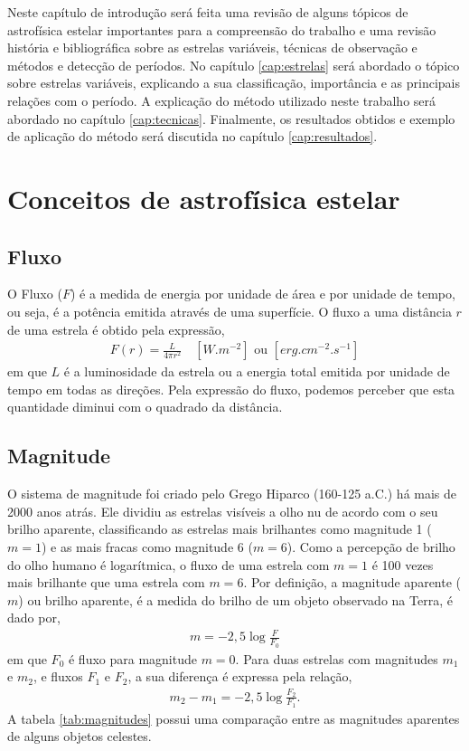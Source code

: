 Neste capítulo de introdução será feita uma revisão de alguns tópicos de astrofísica estelar importantes para a compreensão do trabalho e uma revisão história e bibliográfica sobre as estrelas variáveis, técnicas de observação e métodos e detecção de períodos. No capítulo \ref{cap:estrelas} será abordado o tópico sobre estrelas variáveis, explicando a sua classificação, importância e as principais relações com o período. A explicação do método utilizado neste trabalho será abordado no capítulo \ref{cap:tecnicas}. Finalmente, os resultados obtidos e exemplo de aplicação do método será discutida no capítulo \ref{cap:resultados}.



\section{Conceitos de astrofísica estelar}

\nocite{karttunenLivro}

\subsection{Fluxo}

O Fluxo ($F$) é a medida de energia por unidade de área e por unidade de tempo, ou seja, é a potência emitida através de uma superfície. O fluxo a uma distância $r$ de uma estrela é obtido pela expressão,
\begin{align}
F(r) = \frac{L}{4\pi r^2} \quad \left[ \si{W.m^{-2}}\right] \,\, \text{ou} \,\, \left[\si{erg.cm^{-2}.s^{-1}}\right] \label{eq:fluxo}
\end{align}
em que $L$ é a luminosidade da estrela ou a energia total emitida por unidade de tempo em todas as direções. Pela expressão do fluxo, podemos perceber que esta quantidade diminui com o quadrado da distância.

\subsection{Magnitude}

O sistema de magnitude foi criado pelo Grego Hiparco (160-125 a.C.) há mais de 2000 anos atrás. Ele dividiu as estrelas visíveis a olho nu de acordo com o seu brilho aparente, classificando as estrelas mais brilhantes como magnitude 1 ($m=1$) e as mais fracas como magnitude 6 ($m=6$). Como a percepção de brilho do olho humano é logarítmica, o fluxo de uma estrela com 
$m=1$ é 100 vezes mais brilhante que uma estrela com $m=6$. Por definição, a magnitude aparente ($m$) ou brilho aparente, é a medida do brilho de um objeto observado na Terra, é dado por,
\begin{align}
m = - 2,5 \log \frac{F}{F_0}
\end{align}
em que $F_0$ é fluxo para magnitude $m=0$. Para duas estrelas com magnitudes $m_1$ e $m_2$, e fluxos $F_1$ e $F_2$, a sua diferença é expressa pela relação,
\begin{align}
m_2 - m_1 = -2,5 \log \frac{F_2}{F_1}.
\end{align}
A tabela \ref{tab:magnitudes} possui uma comparação entre as magnitudes aparentes de alguns objetos celestes.

